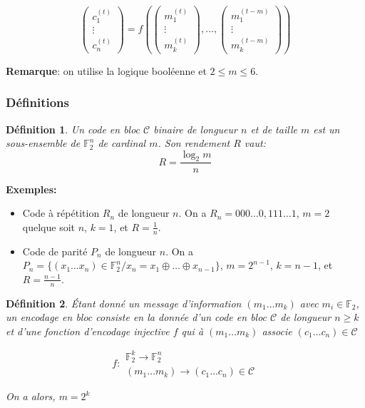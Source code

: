 \documentclass[a4paper,10pt,twocolumn]{article}
\theoremstyle{break}
\newtheorem{mydef}{Définition}
\newenvironment{note}[1]
{\textbf{#1}:}
{}
\newenvironment{remarque}
{\begin{note}{Remarque}}
{\end{note}}
\begin{document}
$$
\left(\begin{array}{c}
 c_1^{(t)}\\
 \vdots \\
 c_n^{(t)}
\end{array}\right)
= f \left(
\left(\begin{array}{c}
 m_1^{(t)}\\
 \vdots \\
 m_k^{(t)}
\end{array}\right)
, \ldots, 
\left(\begin{array}{c}
 m_1^{(t-m)}\\
 \vdots \\
 m_k^{(t-m)}
\end{array}\right)
\right)
$$

\begin{remarque}
 on utilise la logique booléenne et $2 \le m \le 6$.
\end{remarque}

\subsubsection{Définitions}
\begin{mydef}
Un code en bloc $\mathcal{C}$ binaire de longueur $n$ et de taille $m$ est un sous-ensemble de $\mathbb{F}_2^n$ de cardinal $m$.
Son rendement $R$ vaut:
$$ R = \frac{\log_2 m}{n} $$
\end{mydef}

\textbf{Exemples:}
\begin{itemize}
 \item Code à répétition $R_n$ de longueur $n$. On a $R_n = {000 \ldots 0, 111 \ldots 1}$, $m = 2$ quelque soit $n$, $k = 1$, et $R=\frac{1}{n}$.
 \item Code de parité $P_n$ de longueur $n$. On a $P_n = \lbrace (x_1 \ldots x_n) \in \mathbb{F}_2^n / x_n = x_1 \oplus \ldots \oplus x_{n-1} \rbrace$, $m = 2^{n-1}$, $k = n - 1$, et $R = \frac{n-1}{n}$.
\end{itemize}

\begin{mydef}
Étant donné un message d'information $(m_1 \ldots m_k)$ avec $m_i \in \mathbb{F}_2$, un encodage en bloc consiste en la donnée d'un code en bloc $\mathcal{C}$ de longueur $n \ge k$ et d'une fonction d'encodage injective $f$ qui à $(m_1 \ldots m_k)$ associe $(c_1 \ldots c_n) \in \mathcal{C}$

$$ f: \begin{array}{|l}
 \mathbb{F}_2^k \rightarrow \mathbb{F}_2^n\\
 (m_1 \ldots m_k) \rightarrow (c_1 \ldots c_n) \in \mathcal{C}
\end{array}$$

On a alors, $m = 2^k$
\end{mydef}
\end{document}
